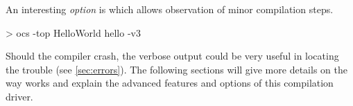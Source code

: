 



An interesting \emph{option} is  which allows observation of minor
compilation steps. 

\begin{prog}
> ocs -top HelloWorld hello -v3
\end{prog}

Should the compiler crash, the verbose output could be very useful in
locating the trouble (see \ref{sec:errors}). The following sections will
give more details on the way  works and  
explain the advanced features and options of this compilation driver. 

